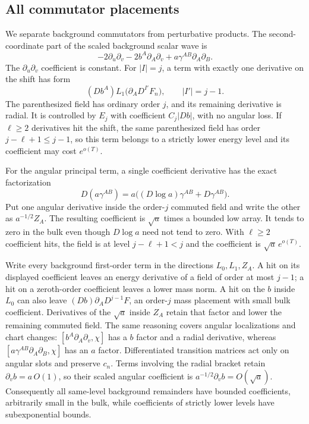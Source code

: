 \subsection{All commutator placements}

We separate background commutators from perturbative products. The
second-coordinate part of the scaled background scalar wave is
\begin{equation}\label{energy:background-principal}
 -2\partial_u\partial_v-2b^A\partial_A\partial_v
                 +a\gamma^{AB}\partial_A\partial_B.
\end{equation}
The \(\partial_u\partial_v\) coefficient is constant. For
\(|I|=j\), a term with exactly one derivative on the shift has form
\[
 (Db^A)L_1\bigl(\partial_AD^{I'}F_n\bigr),
                       \qquad |I'|=j-1.
\]
The parenthesized field has ordinary order \(j\), and its remaining
derivative is radial. It is controlled by \(E_j\) with coefficient
\(C_j|Db|\), with no angular loss. If \(\ell\ge2\) derivatives
hit the shift, the same parenthesized field has order
\(j-\ell+1\le j-1\), so this term belongs to a strictly lower
energy level and its coefficient may cost \(e^{o(T)}\).

For the angular principal term, a single coefficient derivative has
the exact factorization
\[
 D(a\gamma^{AB})
   =a\bigl((D\log a)\gamma^{AB}+D\gamma^{AB}\bigr).
\]
Put one angular derivative inside the order-\(j\) commuted field
and write the other as \(a^{-1/2}Z_A\). The resulting coefficient
is \(\sqrt a\) times a bounded low array. It tends to zero in the
bulk even though \(D\log a\) need not tend to zero. With \(\ell\ge2\)
coefficient hits, the field is at level \(j-\ell+1<j\) and the
coefficient is \(\sqrt a\,e^{o(T)}\).

Write every background first-order term in the directions
\(L_0,L_1,Z_A\). A hit on its displayed coefficient leaves an
energy derivative of a field of order at most \(j-1\); a hit on a
zeroth-order coefficient leaves a lower mass norm. A hit on the
\(b\) inside \(L_0\) can also leave
\((Db)\partial_AD^{j-1}F\), an order-\(j\) mass placement with
small bulk coefficient. Derivatives of the \(\sqrt a\) inside
\(Z_A\) retain that factor and lower the remaining commuted field.
The same reasoning covers angular localizations and chart changes:
\([b^A\partial_A\partial_v,\chi]\) has a \(b\) factor and a
radial derivative, whereas \([a\gamma^{AB}\partial_A\partial_B,\chi]\)
has an \(a\) factor. Differentiated transition matrices act only on
angular slots and preserve \(c_n\). Terms involving the radial
bracket retain \(\partial_vb=a\,O(1)\), so their scaled angular
coefficient is \(a^{-1/2}\partial_vb=O(\sqrt a)\).
Consequently all same-level background remainders have bounded
coefficients, arbitrarily small in the bulk, while coefficients of
strictly lower levels have subexponential bounds.

